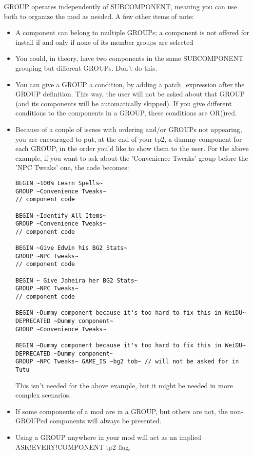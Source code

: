 \documentclass{article}
\begin{document}
GROUP operates independently of SUBCOMPONENT, meaning you can use both to
organize the mod as needed. A few other items of note:
\begin{itemize}
\item A component can belong to multiple GROUPs; a component is not offered
for install if and only if none of its member groups are selected
\item You could, in theory, have two components in the same SUBCOMPONENT
grouping but different GROUPs. Don't do this.
\item You can give a GROUP a condition, by adding a patch_expression after the
GROUP definition. This way, the user will not be asked about that GROUP (and
its components will be automatically skipped). If you give different conditions
to the components in a GROUP, these conditions are OR()red.
\item Because of a couple of issues with ordering and/or GROUPs not appearing,
you are encouraged to put, at the end of your tp2, a dummy component for each
GROUP, in the order you'd like to show them to the user. For the above example,
if you want to ask about the 'Convenience Tweaks' group before the 'NPC Tweaks'
one, the code becomes:
\begin{verbatim}
BEGIN ~100% Learn Spells~
GROUP ~Convenience Tweaks~
// component code

BEGIN ~Identify All Items~
GROUP ~Convenience Tweaks~
// component code

BEGIN ~Give Edwin his BG2 Stats~
GROUP ~NPC Tweaks~
// component code

BEGIN ~ Give Jaheira her BG2 Stats~
GROUP ~NPC Tweaks~
// component code

BEGIN ~Dummy component because it's too hard to fix this in WeiDU~
DEPRECATED ~Dummy component~
GROUP ~Convenience Tweaks~

BEGIN ~Dummy component because it's too hard to fix this in WeiDU~
DEPRECATED ~Dummy component~
GROUP ~NPC Tweaks~ GAME_IS ~bg2 tob~ // will not be asked for in Tutu
\end{verbatim}
This isn't needed for the above example, but it might be needed in more complex
scenarios.
\item If some components of a mod are in a GROUP, but others are not, the
non-GROUPed components will always be presented.
\item Using a GROUP anywhere in your mod will act as an implied
ASK!EVERY!COMPONENT tp2 flag.
\end{itemize}
\end{document}
